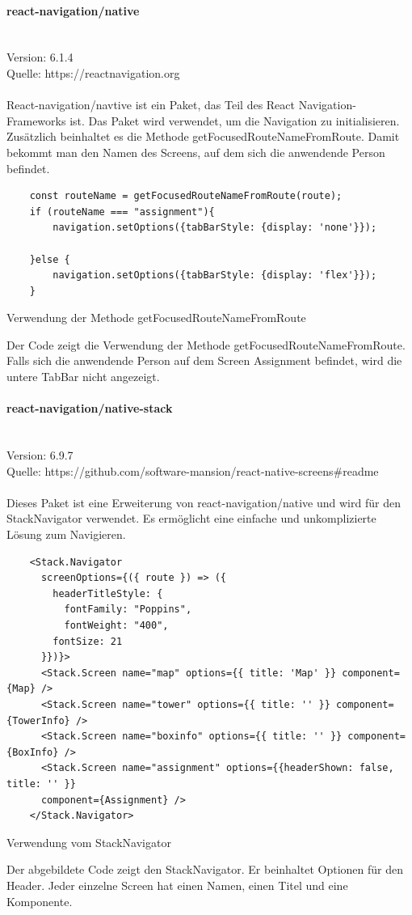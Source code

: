 \paragraph{react-navigation/native}\mbox{}\\
Version: 6.1.4\\
Quelle: https://reactnavigation.org\\ \\
React-navigation/navtive ist ein Paket, das Teil des React Navigation-\Gls{Framework}s ist. Das Paket wird verwendet, um die Navigation zu initialisieren. Zusätzlich beinhaltet es die Methode getFocusedRouteNameFromRoute. Damit bekommt man den Namen des Screens, auf dem sich die anwendende Person befindet.\\
\begin{listing}[H]
  \begin{verbatim}
    const routeName = getFocusedRouteNameFromRoute(route);
    if (routeName === "assignment"){
        navigation.setOptions({tabBarStyle: {display: 'none'}});
        
    }else {
        navigation.setOptions({tabBarStyle: {display: 'flex'}});
    }
\end{verbatim}
  \caption{Verwendung der Methode getFocusedRouteNameFromRoute}
  \label{lst:getfocusedroutename}
\end{listing}
Der Code zeigt die Verwendung der Methode getFocusedRouteNameFromRoute. Falls sich die anwendende Person auf dem Screen Assignment befindet, wird die untere TabBar nicht angezeigt.\\


\paragraph{react-navigation/native-stack}\mbox{}\\
Version: 6.9.7\\
Quelle: https://github.com/software-mansion/react-native-screens\#readme\\ \\
Dieses Paket ist eine Erweiterung von react-navigation/native und wird für den StackNavigator verwendet. Es ermöglicht eine einfache und unkomplizierte Lösung zum Navigieren.
\begin{listing}[H]
  \begin{verbatim}
    <Stack.Navigator
      screenOptions={({ route }) => ({ 
        headerTitleStyle: {
          fontFamily: "Poppins",
          fontWeight: "400",
        fontSize: 21
      }})}>
      <Stack.Screen name="map" options={{ title: 'Map' }} component={Map} />
      <Stack.Screen name="tower" options={{ title: '' }} component={TowerInfo} />
      <Stack.Screen name="boxinfo" options={{ title: '' }} component={BoxInfo} />
      <Stack.Screen name="assignment" options={{headerShown: false, title: '' }} 
      component={Assignment} />
    </Stack.Navigator>
\end{verbatim}
  \caption{Verwendung vom StackNavigator}
  \label{lst:stacknavigator}
\end{listing}
Der abgebildete Code zeigt den StackNavigator. Er beinhaltet Optionen für den Header. Jeder einzelne Screen hat einen Namen, einen Titel und eine Komponente.\\


